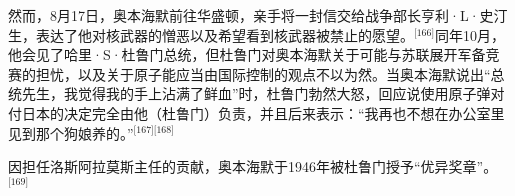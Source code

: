 然而，8月17日，奥本海默前往华盛顿，亲手将一封信交给战争部长亨利·L·史汀生，表达了他对核武器的憎恶以及希望看到核武器被禁止的愿望。\(^\text{[166]}\)同年10月，他会见了哈里·S·杜鲁门总统，但杜鲁门对奥本海默关于可能与苏联展开军备竞赛的担忧，以及关于原子能应当由国际控制的观点不以为然。当奥本海默说出“总统先生，我觉得我的手上沾满了鲜血”时，杜鲁门勃然大怒，回应说使用原子弹对付日本的决定完全由他（杜鲁门）负责，并且后来表示：“我再也不想在办公室里见到那个狗娘养的。”\(^\text{[167][168]}\)

因担任洛斯阿拉莫斯主任的贡献，奥本海默于1946年被杜鲁门授予“优异奖章”。\(^\text{[169]}\)

